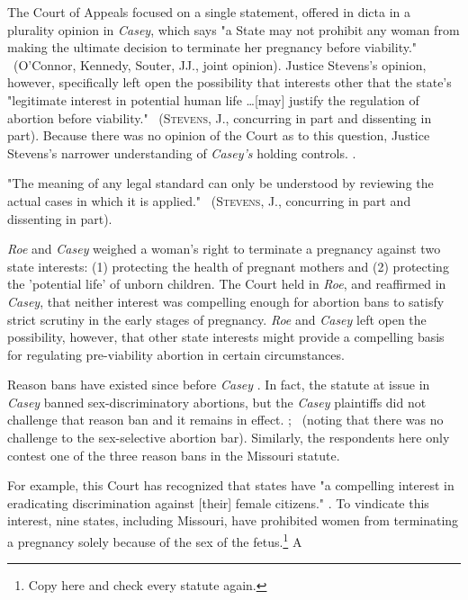 \documentclass[12pt,\documentclassflag]{SCOTUS_Brief}
\begin{document}
The Court of Appeals focused on a single statement, offered in dicta in a plurality opinion in \textit{Casey}, which says "a State may not prohibit any woman from making the ultimate decision to terminate her pregnancy before viability." ~(O'Connor, Kennedy, Souter, JJ., joint opinion). Justice Stevens's opinion, however, specifically left open the possibility that interests other that the state's "legitimate interest in potential human life \ldots  [may] justify the regulation of abortion before viability." ~(\textsc{Stevens}, J., concurring in part and dissenting in part). Because there was no opinion of the Court as to this question, Justice Stevens's narrower understanding of \textit{Casey's} holding controls. \Seegenerally \cite{Marks}.

"The meaning of any legal standard can only be understood by reviewing the actual cases in which it is applied." ~(\textsc{Stevens}, J., concurring in part and dissenting in part).

\textit{Roe} \cite[!]{Roe} and \textit{Casey} \cite[!]{Casey} weighed a woman's right to terminate a pregnancy against two state interests: (1) protecting the health of pregnant mothers and (2) protecting the 'potential life' of unborn children. The Court held in \textit{Roe}, and reaffirmed in \textit{Casey}, that neither interest was compelling enough for abortion bans to satisfy strict scrutiny in the early stages of pregnancy. \textit{Roe} \cite[!]{Roe} and \textit{Casey} \cite[!]{Casey} left open the possibility, however, that other state interests might provide a compelling basis for regulating pre-viability abortion in certain circumstances.

Reason bans have existed since before \textit{Casey} \cite[1]{Casey}. In fact, the statute at issue in \textit{Casey} banned sex-discriminatory abortions, but the \textit{Casey} plaintiffs did not challenge that reason ban and it remains in effect. \See {}; \seealso {}~(noting that there was no challenge to the sex-selective abortion bar). Similarly, the respondents here only contest one of the three reason bans in the Missouri statute. 

For example, this Court has recognized that states have "a compelling interest in eradicating discrimination against [their] female citizens." . To vindicate this interest, nine states, including Missouri, have prohibited women from terminating a pregnancy solely because of the sex of the fetus.\footnote{Copy here and check every statute again.} A
\end{document}
